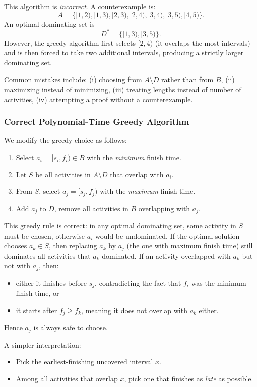 \documentclass[9pt]{extarticle}
\begin{document}
This algorithm is \emph{incorrect}.  
A counterexample is:
\[
A = \{[1,2), [1,3), [2,3), [2,4), [3,4), [3,5), [4,5)\}.
\]
An optimal dominating set is
\[
D^* = \{[1,3), [3,5)\}.
\]
However, the greedy algorithm first selects \([2,4)\) (it overlaps the most
intervals) and is then forced to take two additional intervals, producing
a strictly larger dominating set.

Common mistakes include:
(i) choosing from \(A \setminus D\) rather than from \(B\),
(ii) maximizing instead of minimizing,
(iii) treating lengths instead of number of activities,
(iv) attempting a proof without a counterexample.

\subsubsection*{Correct Polynomial-Time Greedy Algorithm}
We modify the greedy choice as follows:
\begin{enumerate}
    \item Select \(a_i = [s_i, f_i) \in B\) with the \emph{minimum} finish time.
    \item Let \(S\) be all activities in \(A \setminus D\) that overlap with \(a_i\).
    \item From \(S\), select \(a_j = [s_j, f_j)\) with the \emph{maximum} finish time.
    \item Add \(a_j\) to \(D\), remove all activities in \(B\) overlapping with \(a_j\).
\end{enumerate}

This greedy rule is correct:  
in any optimal dominating set, some activity in \(S\) must be chosen,
otherwise \(a_i\) would be undominated. If the optimal solution chooses
\(a_k \in S\), then replacing \(a_k\) by \(a_j\) (the one with maximum
finish time) still dominates all activities that \(a_k\) dominated.
If an activity overlapped with \(a_k\) but not with \(a_j\), then:
\begin{itemize}
    \item either it finishes before \(s_j\), contradicting the fact that
          \(f_i\) was the minimum finish time, or
    \item it starts after \(f_j \ge f_k\), meaning it does not overlap
          with \(a_k\) either.
\end{itemize}
Hence \(a_j\) is always safe to choose.

A simpler interpretation:
\begin{itemize}
    \item Pick the earliest-finishing uncovered interval \(x\).
    \item Among all activities that overlap \(x\), pick one that finishes as \emph{late} as possible.
\end{itemize}
\end{document}
